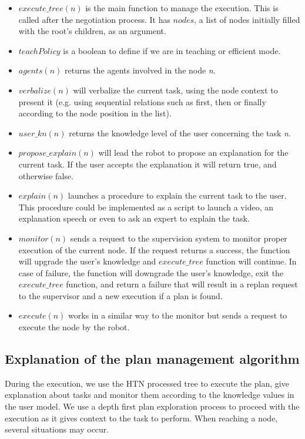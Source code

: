 \begin{itemize}
\item \textit{$execute\_tree(n)$} is the main function to manage the execution. This is called after the negotiation process. It has \textit{$nodes$}, a list of nodes initially filled with the root's children, as an argument.
\item \textit{$teachPolicy$} is a boolean to define if we are in teaching or efficient mode.
\item \textit{$agents(n)$} returns the agents involved in the node \textit{n}.
\item \textit{$verbalize(n)$} will verbalize the current task, using the node context to present it (e.g. using sequential relations such as first, then or finally according to the node position in the list).
\item \textit{$user\_kn(n)$} returns the knowledge level of the user concerning the task \textit{n}.
\item \textit{$propose\_explain(n)$} will lead the robot to propose an explanation for the current task. If the user accepts the explanation it will return true, and otherwise false.
\item \textit{$explain(n)$} launches a procedure to explain the current task to the user. This procedure could be implemented as a script to launch a video, an explanation speech or even to ask an expert to explain the task.
\item \textit{$monitor(n)$} sends a request to the supervision system to monitor proper execution of the current node. If the request returns a success, the function will upgrade the user's knowledge and \textit{$execute\_tree$} function will continue. In case of failure, the function will downgrade the user's knowledge, exit the \textit{$execute\_tree$} function, and return a failure that will result in a replan request to the supervisor and a new execution if a plan is found.
\item \textit{$execute(n)$} works in a similar way to the monitor but sends a request to execute the node by the robot.
\end{itemize}
 
\subsection{Explanation of the plan management algorithm}
During the execution, we use the HTN processed tree to execute the plan, give explanation about tasks and monitor them according to the knowledge values in the user model.
We use a depth first plan exploration process to proceed with the execution as it gives context to the task to perform.
When reaching a node, several situations may occur.


